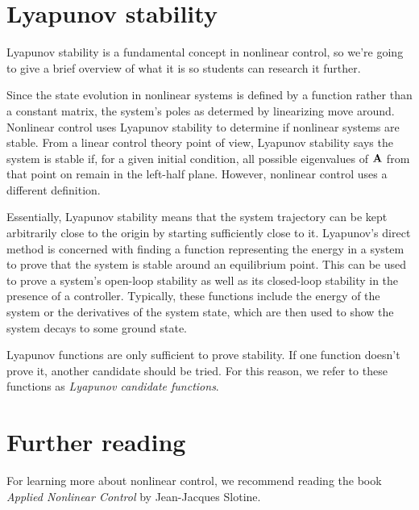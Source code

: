 \section{Lyapunov stability}

Lyapunov stability is a fundamental concept in nonlinear control, so we're going
to give a brief overview of what it is so students can research it further.

Since the state evolution in nonlinear systems is defined by a function rather
than a constant matrix, the system's poles as determed by linearizing move
around. Nonlinear control uses Lyapunov stability to determine if nonlinear
systems are stable. From a linear control theory point of view, Lyapunov
stability says the system is stable if, for a given initial condition, all
possible eigenvalues of $\mathbf{A}$ from that point on remain in the left-half
plane. However, nonlinear control uses a different definition.

Essentially, Lyapunov stability means that the system trajectory can be kept
arbitrarily close to the origin by starting sufficiently close to it. Lyapunov's
direct method is concerned with finding a function representing the energy in a
system to prove that the system is stable around an equilibrium point. This can
be used to prove a system's open-loop stability as well as its closed-loop
stability in the presence of a controller. Typically, these functions include
the energy of the system or the derivatives of the system state, which are then
used to show the system decays to some ground state.

Lyapunov functions are only sufficient to prove stability. If one function
doesn't prove it, another candidate should be tried. For this reason, we refer
to these functions as \textit{Lyapunov candidate functions}.

\section{Further reading}

For learning more about nonlinear control, we recommend reading the book
\textit{Applied Nonlinear Control} by Jean-Jacques Slotine.
